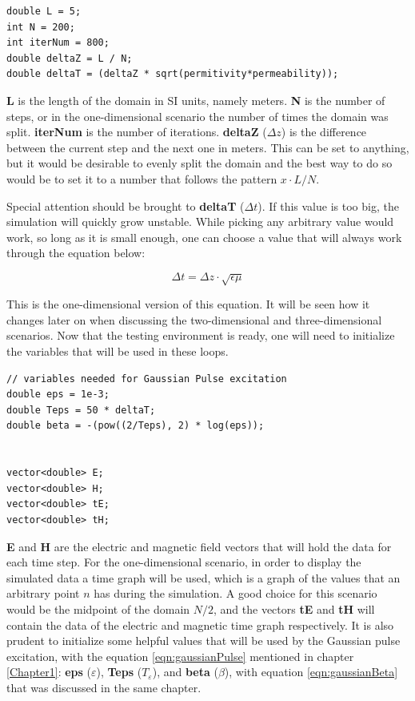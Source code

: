 \begin{verbatim}
double L = 5;
int N = 200;
int iterNum = 800;
double deltaZ = L / N;
double deltaT = (deltaZ * sqrt(permitivity*permeability));
\end{verbatim}

\textbf{L} is the length of the domain in SI units, namely meters. \textbf{N} is the number of steps, or in the one-dimensional scenario the number of times the domain was split. \textbf{iterNum} is the number of iterations. \textbf{deltaZ} ($\Delta z$) is the difference between the current step and the next one in meters. This can be set to anything, but it would be desirable to evenly split the domain and the best way to do so would be to set it to a number that follows the pattern $x \cdot L/N$.

Special attention should be brought to \textbf{deltaT} ($\Delta t$). If this value is too big, the simulation will quickly grow unstable. While picking any arbitrary value would work, so long as it is small enough, one can choose a value that will always work through the equation below:

\begin{equation}
	\label{eqn:deltaTcode}
	\Delta t = \Delta z \cdot \sqrt{\epsilon \mu}
\end{equation}

This is the one-dimensional version of this equation. It will be seen how it changes later on when discussing the two-dimensional and three-dimensional scenarios. Now that the testing environment is ready, one will need to initialize the variables that will be used in these loops.

\begin{verbatim}
// variables needed for Gaussian Pulse excitation
double eps = 1e-3;
double Teps = 50 * deltaT;
double beta = -(pow((2/Teps), 2) * log(eps));


vector<double> E;
vector<double> H;
vector<double> tE;
vector<double> tH;
\end{verbatim}

\textbf{E} and \textbf{H} are the electric and magnetic field vectors that will hold the data for each time step. For the one-dimensional scenario, in order to display the simulated data a time graph will be used, which is a graph of the values that an arbitrary point $n$ has during the simulation. A good choice  for this scenario would be the midpoint of the domain $N/2$, and the vectors \textbf{tE} and \textbf{tH} will contain the data of the electric and magnetic time graph respectively. It is also prudent to initialize some helpful values that will be used by the Gaussian pulse excitation, with the equation \ref{eqn:gaussianPulse} mentioned in chapter \ref{Chapter1}: \textbf{eps} ($\varepsilon$), \textbf{Teps} ($T_\varepsilon$), and \textbf{beta} ($\beta$), with equation \ref{eqn:gaussianBeta} that was discussed in the same chapter.


